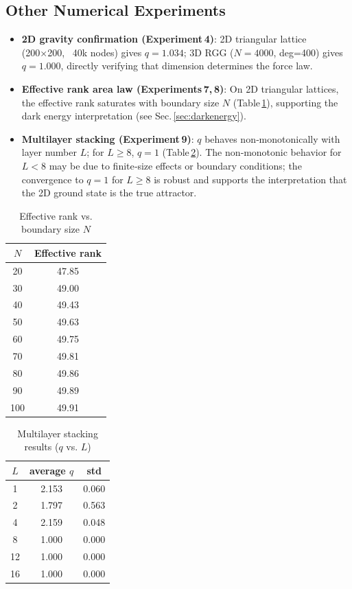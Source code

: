 \documentclass[12pt,a4paper]{article}
\begin{document}
\subsection{Other Numerical Experiments}
\begin{itemize}
    \item \textbf{2D gravity confirmation (Experiment 4)}: 2D triangular lattice (200×200, ~40k nodes) gives $q=1.034$; 3D RGG ($N=4000$, deg=400) gives $q=1.000$, directly verifying that dimension determines the force law.
    \item \textbf{Effective rank area law (Experiments 7, 8)}: On 2D triangular lattices, the effective rank saturates with boundary size $N$ (Table \ref{tab:cosmo}), supporting the dark energy interpretation (see Sec. \ref{sec:darkenergy}).
    \item \textbf{Multilayer stacking (Experiment 9)}: $q$ behaves non‑monotonically with layer number $L$; for $L\ge 8$, $q=1$ (Table \ref{tab:multilayer}). The non‑monotonic behavior for $L<8$ may be due to finite‑size effects or boundary conditions; the convergence to $q=1$ for $L\ge 8$ is robust and supports the interpretation that the 2D ground state is the true attractor.
\end{itemize}

\begin{table}[htbp]
\centering
\caption{Effective rank vs. boundary size $N$}
\label{tab:cosmo}
\begin{tabular}{cc}
\toprule
$N$ & Effective rank \\
\midrule
20 & 47.85 \\
30 & 49.00 \\
40 & 49.43 \\
50 & 49.63 \\
60 & 49.75 \\
70 & 49.81 \\
80 & 49.86 \\
90 & 49.89 \\
100 & 49.91 \\
\bottomrule
\end{tabular}
\end{table}

\begin{table}[htbp]
\centering
\caption{Multilayer stacking results ($q$ vs. $L$)}
\label{tab:multilayer}
\begin{tabular}{ccc}
\toprule
$L$ & average $q$ & std \\
\midrule
1 & 2.153 & 0.060 \\
2 & 1.797 & 0.563 \\
4 & 2.159 & 0.048 \\
8 & 1.000 & 0.000 \\
12 & 1.000 & 0.000 \\
16 & 1.000 & 0.000 \\
\bottomrule
\end{tabular}
\end{table}
\end{document}
